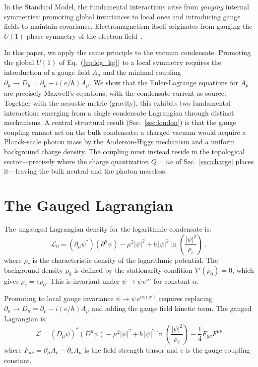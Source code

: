 \documentclass[12pt, a4paper]{article}
\begin{document}
In the Standard Model, the fundamental interactions arise from \emph{gauging} internal symmetries: promoting global invariances to local ones and introducing gauge fields to maintain covariance. Electromagnetism itself originates from gauging the $U(1)$ phase symmetry of the electron field~\cite{weinberg_1995}.

In this paper, we apply the same principle to the vacuum condensate. Promoting the global $U(1)$ of Eq.~(\ref{eq:log_kg}) to a local symmetry requires the introduction of a gauge field $A_\mu$ and the minimal coupling $\partial_\mu \to D_\mu = \partial_\mu - i(e/\hbar)A_\mu$. We show that the Euler-Lagrange equations for $A_\mu$ are precisely Maxwell's equations, with the condensate current as source. Together with the acoustic metric (gravity), this exhibits two fundamental interactions emerging from a single condensate Lagrangian through distinct mechanisms. A central structural result (Sec.~\ref{sec:london}) is that the gauge coupling cannot act on the bulk condensate: a charged vacuum would acquire a Planck-scale photon mass by the Anderson-Higgs mechanism and a uniform background charge density. The coupling must instead reside in the topological sector---precisely where the charge quantization $Q = ne$ of Sec.~\ref{sec:charge} places it---leaving the bulk neutral and the photon massless.


\section{The Gauged Lagrangian}
\label{sec:lagrangian}

The ungauged Lagrangian density for the logarithmic condensate is:
\begin{equation}
    \mathcal{L}_0 = (\partial_\mu\psi^*)(\partial^\mu\psi)
    - \mu^2|\psi|^2
    + b\,|\psi|^2\ln\!\left(\frac{|\psi|^2}{\rho_c}\right)\,,
\label{eq:L0}
\end{equation}
where $\rho_c$ is the characteristic density of the logarithmic potential. The background density $\rho_0$ is defined by the stationarity condition $V'(\rho_0) = 0$, which gives $\rho_c = e\rho_0$. This is invariant under $\psi \to \psi\,e^{i\alpha}$ for constant $\alpha$.

Promoting to local gauge invariance $\psi \to \psi\,e^{i\alpha(x)}$ requires replacing $\partial_\mu \to D_\mu = \partial_\mu - i(e/\hbar)A_\mu$ and adding the gauge field kinetic term. The gauged Lagrangian is:
\begin{equation}
    \boxed{\;\mathcal{L} = (D_\mu\psi)^*(D^\mu\psi)
    - \mu^2|\psi|^2
    + b\,|\psi|^2\ln\!\left(\frac{|\psi|^2}{\rho_c}\right)
    - \frac{1}{4}F_{\mu\nu}F^{\mu\nu}\;}
\label{eq:L_gauged}
\end{equation}
where $F_{\mu\nu} = \partial_\mu A_\nu - \partial_\nu A_\mu$ is the field strength tensor and $e$ is the gauge coupling constant.
\end{document}
